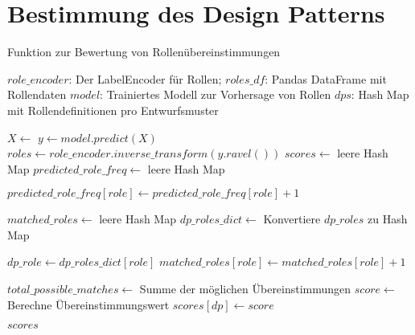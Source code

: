 \section{Bestimmung des Design Patterns}

\begin{algorithm}
    \caption{Funktion zur Bewertung von Rollenübereinstimmungen}
    \label{pattern_matching}
    \begin{algorithmic}[1]
    \Require $role\_encoder$: Der LabelEncoder für Rollen; 
    \Require $roles\_df$: Pandas DataFrame mit Rollendaten
    \Require $model$: Trainiertes Modell zur Vorhersage von Rollen
    \Require $dps$: Hash Map mit Rollendefinitionen pro Entwurfsmuster
    
    
        \State $X \gets$ 
        \State $y \gets model.predict(X)$
        \State $roles \gets role\_encoder.inverse\_transform(y.ravel())$
        \State $scores \gets$ leere Hash Map
        \State $predicted\_role\_freq \gets$ leere Hash Map
        
            \State $predicted\_role\_freq[role] \gets predicted\_role\_freq[role] + 1$
        \EndFor
        
            \State $matched\_roles \gets$ leere Hash Map
            \State $dp\_roles\_dict \gets$ Konvertiere $dp\_roles$ zu Hash Map
            
                    \State $dp\_role \gets dp\_roles\_dict[role]$
                        \State $matched\_roles[role] \gets matched\_roles[role] + 1$
                    \EndIf
                \EndIf
            \EndFor
            
            \State $total\_possible\_matches \gets$ Summe der möglichen Übereinstimmungen
            \State $score \gets$ Berechne Übereinstimmungswert
            \State $scores[dp] \gets score$
        \EndFor
        
        \State \Return $scores$
    \EndFunction
    \end{algorithmic}
\end{algorithm}
    
